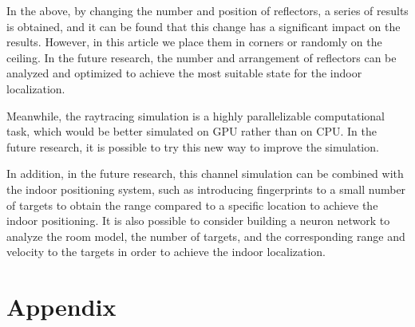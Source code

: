 \documentclass[12pt,DIV14,BCOR12mm,a4paper,footinclude=false,headinclude,parskip=half-,twoside,openright,cleardoublepage=empty,toc=index,bibliography=totoc,listof=totoc]{scrreprt}
\numberwithin{equation}{chapter}
\begin{document}
In the above, by changing the number and position of reflectors, a series of results is obtained, and it can be found that this change has a significant impact on the results. However, in this article we place them in corners or randomly on the ceiling. In the future research, the number and arrangement of reflectors can be analyzed and optimized to achieve the most suitable state for the indoor localization.

Meanwhile, the raytracing simulation is a highly parallelizable computational task, which would be better simulated on GPU rather than on CPU. In the future research, it is possible to try this new way to improve the simulation.

In addition, in the future research, this channel simulation can be combined with the indoor positioning system, such as introducing fingerprints to a small number of targets to obtain the range compared to a specific location to achieve the indoor positioning. It is also possible to consider building a neuron network to analyze the room model, the number of targets, and the corresponding range and velocity to the targets in order to achieve the indoor localization.

\appendix
\chapter{Appendix}
\end{document}
